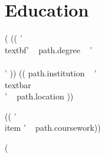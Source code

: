 \documentclass[a4paper,10pt]{article}
\begin{document}
\section*{Education}
(%
    (( '\\textbf{' ~ path.degree ~ '} \\\\' ))
    (( path.institution ~ ' \\textbar\\ ' ~ path.location ))
\begin{itemize}[itemsep=0em]
    (( '\\item ' ~ path.coursework))
\end{itemize}
(%
\end{document}
